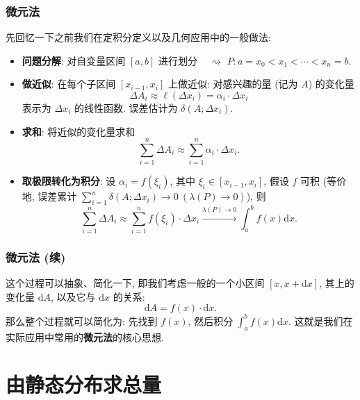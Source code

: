 
\begin{frame}
\frametitle{微元法}

先回忆一下之前我们在定积分定义以及几何应用中的一般做法:

\begin{itemize}[<+->]
\item \textbf{问题分解}: 对自变量区间 $[a,b]$ 进行划分 ~ $\rightsquigarrow$ $P: a=x_0 < x_1 < \cdots < x_n=b$.
\item \textbf{做近似}: 在每个子区间 $[x_{i-1}, x_i]$ 上做近似: 对感兴趣的量 (记为 $A$) 的变化量
\[
\Delta A_i \approx \ell(\Delta x_i) = \alpha_i \cdot \Delta x_i
\]
表示为 $\Delta x_i$ 的线性函数. 误差估计为 $\delta(A; \Delta x_i).$
\item \textbf{求和}: 将近似的变化量求和
\[
\sum_{i=1}^n \Delta A_i \approx \sum_{i=1}^n \alpha_i \cdot \Delta x_i.
\]
\item \textbf{取极限转化为积分}: 设 $\alpha_i = f(\xi_i)$, 其中 $\xi_i \in [x_{i-1}, x_i]$, 假设 $f$ 可积 (等价地, 误差累计 $\sum_{i=1}^n \delta(A; \Delta x_i) \to 0 ~ (\lambda(P) \to 0)$), 则
\[
\sum_{i=1}^n \Delta A_i \approx \sum_{i=1}^n f(\xi_i) \cdot \Delta x_i \xrightarrow{\lambda(P) \to 0} \int_a^b f(x) \mathrm{d}x.
\]
\end{itemize}


\end{frame}


\begin{frame}
\frametitle{微元法 (续)}

这个过程可以抽象、简化一下, 即我们考虑一般的一个小区间 $[x, x+\mathrm{d}x]$, 其上的变化量 $\mathrm{d}A$, 以及它与 $\mathrm{d}x$ 的关系:
\[
\mathrm{d}A = f(x) \cdot \mathrm{d}x.
\]
那么整个过程就可以简化为: 先找到 $f(x)$, 然后积分 $\int_a^b f(x) \mathrm{d}x$. 这就是我们在实际应用中常用的\textbf{微元法}的核心思想.

\end{frame}


\section{由静态分布求总量}


